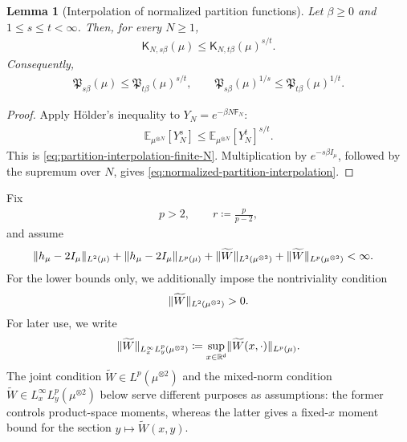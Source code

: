 \documentclass[11pt,reqno]{amsart}
\numberwithin{equation}{section}
\theoremstyle{plain}
\newtheorem{lemma}[lemma]{Lemma}
\theoremstyle{remark}
\DeclarePairedDelimiter{\norm}{\lVert}{\rVert}
\renewcommand{\d}{\mathsf{d}}
\newcommand{\R}{{\mathbb{R}}}
\newcommand{\E}{{\mathbb{E}}}
\newcommand{\K}{{\mathsf{K}}}
\newcommand{\tl}{\widetilde}
\newcommand{\Fr}{{\mathsf{F}}}
\newcommand{\be}{\beta}
\begin{document}
\begin{lemma}[Interpolation of normalized partition functions]\label{lem:normalized-partition-interpolation}
Let \(\be\ge0\) and \(1\le s\le t<\infty\).  Then, for every \(N\ge1\),
\begin{align}\label{eq:partition-interpolation-finite-N}
 \K_{N,s\be}(\mu)
 \le \K_{N,t\be}(\mu)^{s/t}.
\end{align}
Consequently,
\begin{align}\label{eq:normalized-partition-interpolation}
 \mathfrak P_{s\be}(\mu)
 \le \mathfrak P_{t\be}(\mu)^{s/t},
 \qquad
 \mathfrak P_{s\be}(\mu)^{1/s}
 \le \mathfrak P_{t\be}(\mu)^{1/t}.
\end{align}
\end{lemma}

\begin{proof}
Apply H\"older's inequality to \(Y_N=e^{-\be N\Fr_N}\):
\begin{align}\label{eq:partition-interpolation-holder}
 \E_{\mu^{\otimes N}}\left[Y_N^s\right]
 \le \E_{\mu^{\otimes N}}\left[Y_N^t\right]^{s/t}.
\end{align}
This is \eqref{eq:partition-interpolation-finite-N}.  Multiplication by \(e^{-s\be I_\mu}\), followed by the supremum over \(N\), gives \eqref{eq:normalized-partition-interpolation}.
\end{proof}

Fix
\begin{align}\label{eq:p-choice-quantitative}
 p>2,
 \qquad
 r\coloneqq\frac{p}{p-2},
\end{align}
and assume
\begin{align}\label{eq:mu-controls}
 &\norm{h_\mu-2I_\mu}_{L^2(\mu)}
 +\norm{h_\mu-2I_\mu}_{L^p(\mu)}
 +\norm{\tl W}_{L^2(\mu^{\otimes2})}
 +\norm{\tl W}_{L^p(\mu^{\otimes2})}<\infty.
\end{align}
For the lower bounds only, we additionally impose the nontriviality condition
\begin{align}\label{eq:interaction-nontriviality}
 \norm{\tl W}_{L^2(\mu^{\otimes2})}>0.
\end{align}  For later use, we write
\begin{align}\label{eq:mixed-section-norm}
 \norm{\tl W}_{L_x^\infty L_y^p(\mu^{\otimes2})}
 \coloneqq
 \sup_{x\in\R^\d}\norm{\tl W(x,\cdot)}_{L^p(\mu)}.
\end{align}
The joint condition \(\tl W\in L^p(\mu^{\otimes2})\) and the mixed-norm condition \(\tl W\in L_x^\infty L_y^p(\mu^{\otimes2})\) below serve different purposes as assumptions: the former controls product-space moments, whereas the latter gives a fixed-\(x\) moment bound for the section \(y\mapsto\tl W(x,y)\).
\end{document}
